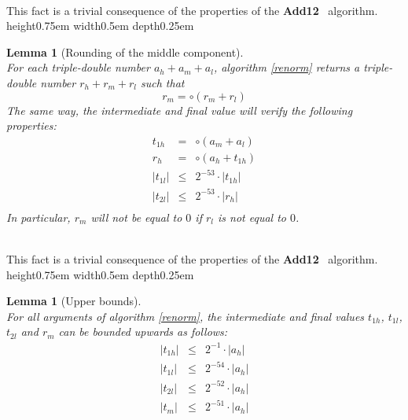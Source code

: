 \documentclass[a4paper,10pt,twoside]{article}
\newtheorem{lemma}[theorem]{Lemma}
\newenvironment{proof}[1][Proof]{\begin{trivlist}
\item[\hskip \labelsep {\bfseries #1}]}{\end{trivlist}}
\newcommand{\qed}{\nobreak \ifvmode \relax \else \ifdim \lastskip<1.5em \hskip-\lastskip
\hskip1.5em plus0em minus0.5em \fi \nobreak \vrule height0.75em width0.5em depth0.25em\fi}
\newcommand{\hi}{\ensuremath{\mathit{h}}}
\newcommand{\mi}{\ensuremath{\mathit{m}}}
\newcommand{\lo}{\ensuremath{\mathit{l}}}
\newcommand{\Add}{{\bf Add12}}
\begin{document}
\begin{proof} ~\\
This fact is a trivial consequence of the properties of the \Add~ algorithm. \qed
\end{proof}
\begin{lemma}[Rounding of the middle component] \label{properties}~\\
For each triple-double number $a_\hi + a_\mi + a_\lo$, algorithm \ref{renorm} 
returns a triple-double number $r_\hi + r_\mi + r_\lo$ such that
$$r_\mi = \circ \left( r_\mi + r_\lo \right)$$
The same way, the intermediate and final value will verify the following properties:
\begin{eqnarray*}
t_{1\hi} & = & \circ \left( a_\mi + a_\lo \right) \\
r_\hi & = & \circ \left( a_\hi + t_{1\hi} \right) \\
\left \vert t_{1\lo} \right \vert & \leq & 2^{-53} \cdot \left \vert t_{1\hi} \right \vert \\ 
\left \vert t_{2\lo} \right \vert & \leq & 2^{-53} \cdot \left \vert r_\hi \right \vert \\ 
\end{eqnarray*}
In particular, $r_\mi$ will not be equal to $0$ if $r_\lo$ is not equal to $0$.
\end{lemma}
\begin{proof} ~\\
This fact is a trivial consequence of the properties of the \Add~ algorithm. \qed
\end{proof}
\begin{lemma}[Upper bounds] \label{major}~\\
For all arguments of algorithm \ref{renorm}, 
the intermediate and final values 
$t_{1\hi}$, $t_{1\lo}$, $t_{2\lo}$ and $r_\mi$
can be bounded upwards as follows:
\begin{eqnarray*}
\left \vert t_{1\hi} \right \vert & \leq & 2^{-1} \cdot \left \vert a_\hi \right \vert \\
\left \vert t_{1\lo} \right \vert & \leq & 2^{-54} \cdot \left \vert a_\hi \right \vert \\
\left \vert t_{2\lo} \right \vert & \leq & 2^{-52} \cdot \left \vert a_\hi \right \vert \\
\left \vert t_\mi \right \vert & \leq & 2^{-51} \cdot \left \vert a_\hi \right \vert 
\end{eqnarray*}
\end{lemma}
\end{document}
